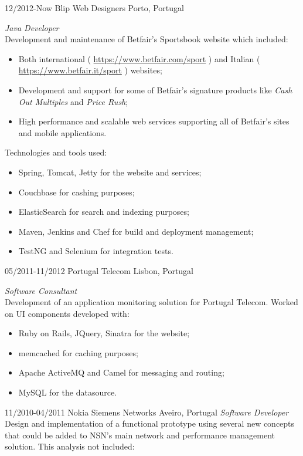 \documentclass[]{friggeri-cv}
\begin{document}
\begin{entrylist}
\entry
{12/2012-Now}
{Blip Web Designers}
{Porto, Portugal}
{\emph{Java Developer} \\
Development and maintenance of Betfair's Sportsbook website which included:
\begin{itemize}
  \item Both international ( \href{https://www.betfair.com/sport}{https://www.betfair.com/sport} ) and Italian ( \href{https://www.betfair.it/sport}{https://www.betfair.it/sport} ) websites;
  \item Development and support for some of Betfair's signature products like \emph{Cash Out Multiples} and \emph{Price Rush};
  \item High performance and scalable web services supporting all of Betfair's sites and mobile applications.
\end{itemize}
Technologies and tools used:
\begin{itemize}
  \item Spring, Tomcat, Jetty for the website and services;
  \item Couchbase for cashing purposes;
  \item ElasticSearch for search and indexing purposes;
  \item Maven, Jenkins and Chef for build and deployment management;
  \item TestNG and Selenium for integration tests.
\end{itemize}
}
\entry
{05/2011-11/2012}
{Portugal Telecom}
{Lisbon, Portugal}
{\emph{Software Consultant} \\
Development of an application monitoring solution for Portugal Telecom. Worked on UI components developed with:
\begin{itemize}
\item Ruby on Rails, JQuery, Sinatra for the website;
\item memcached for caching purposes;
\item Apache ActiveMQ and Camel for messaging and routing;
\item MySQL for the datasource.
\end{itemize}
}
\entry
{11/2010-04/2011}
{Nokia Siemens Networks}
{Aveiro, Portugal}
{\emph{Software Developer} \\
Design and implementation of a functional prototype using several new concepts that could be added to NSN's main network and performance management solution. This analysis not included:
}
\end{entrylist}
\end{document}
